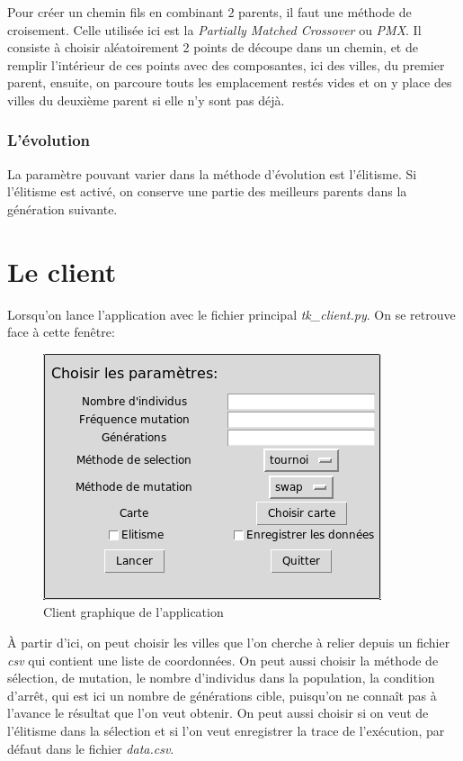\documentclass[12pt]{article}
\begin{document}
Pour créer un chemin fils en combinant 2 parents, il faut une méthode de croisement. Celle utilisée ici
est la \emph{Partially Matched Crossover} ou \emph{PMX}. Il consiste à choisir aléatoirement 2 points de découpe
dans un chemin, et de remplir l'intérieur de ces points avec des composantes, ici des villes, du premier parent,
ensuite, on parcoure touts les emplacement restés vides et on y place des villes du deuxième parent si elle n'y sont pas
déjà.

\subsubsection*{L'évolution}

La paramètre pouvant varier dans la méthode d'évolution est l'élitisme. Si l'élitisme
est activé, on conserve une partie des meilleurs parents dans la génération suivante.


\section{Le client}

Lorsqu'on lance l'application avec le fichier principal \emph{tk\_client.py}. On se retrouve face à cette fenêtre:
\begin{figure}[H]
\centering
\includegraphics[width=.6\linewidth]{./screen_client.png}
\caption{Client graphique de l'application}
\end{figure}
À partir d'ici, on peut choisir les villes que l'on cherche à relier depuis un fichier \emph{csv} qui contient une liste
de coordonnées. On peut aussi choisir la méthode de sélection, de mutation, le nombre d'individus dans la population, la condition
d'arrêt, qui est ici un nombre de générations cible, puisqu'on ne connaît pas à l'avance le résultat que l'on veut obtenir.
On peut aussi choisir si on veut de l'élitisme dans la sélection et si l'on veut enregistrer la trace de l'exécution, par défaut
dans le fichier \emph{data.csv}.
\end{document}
